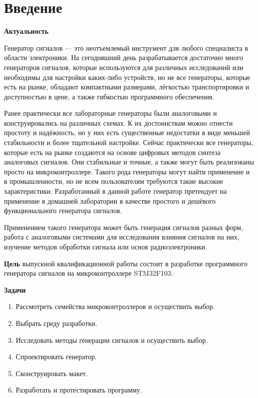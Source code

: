 \chapter*{Введение}

\textbf{Актуальность}

	Генератор сигналов --- это неотъемлемый инструмент для любого специалиста в области электроники. На сегодняшний день разрабатывается достаточно много генераторов сигналов, которые используются для различных исследований или необходимы для настройки каких-либо устройств, но не все генераторы, которые есть на рынке, обладают компактными размерами, лёгкостью транспортировки и доступностью в цене, а также гибкостью программного обеспечения. %
	
	Ранее практически все лабораторные генераторы были аналоговыми и конструировались на различных схемах. К их достоинствам можно отнести простоту и надёжность, но у них есть существенные недостатки в виде меньшей стабильности и более тщательной настройке. Сейчас практически все генераторы, которые есть на рынке создаются на основе цифровых методов синтеза аналоговых сигналов. %
	 Они стабильные и точные, а также могут быть реализованы просто на микроконтроллере. Такого рода генераторы могут найти применение и в промышленности, но не всем пользователям требуются такие высокие характеристики. Разработанный в данной работе генератор претендует на применение в домашней лаборатории в качестве простого и дешёвого функционального генератора сигналов.
	
	Применением такого генератора может быть генерация сигналов разных форм, работа с аналоговыми системами для исследования влияния сигналов на них, изучение методов обработки сигнала или основ радиоэлектроники. 
	
\textbf{Цель}
выпускной квалификационной работы состоит в разработке программного генератора сигналов на микроконтроллере STM32F103.

\textbf{Задачи}

\begin{enumerate}
\item Рассмотреть семейства микроконтроллеров и осуществить выбор.
\item Выбрать среду разработки.
\item Исследовать методы генерации сигналов и осуществить выбор.
\item Спроектировать генератор.
\item Сконструировать макет.
\item Разработать и протестировать программу.
\end{enumerate}


